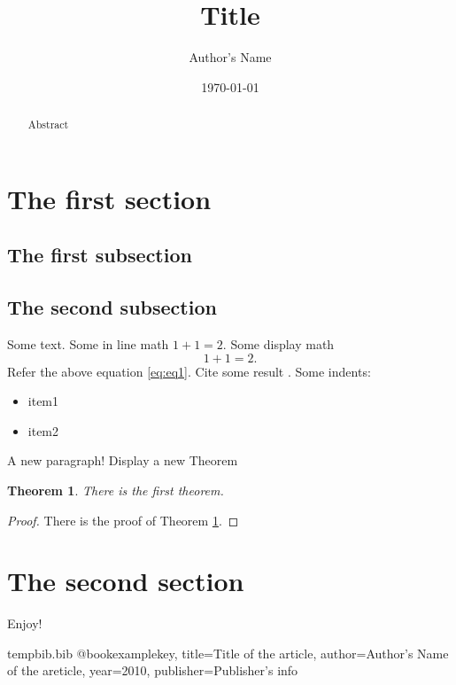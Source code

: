 \documentclass[12pt,a4paper]{amsart}
\title[In line title]{ \large Title}
\author{Author's Name}
\date{\today}
\newtheorem{thm}{Theorem}[section]
\begin{document}
\begin{abstract}
Abstract
\end{abstract}
\maketitle
\section{The first section}\label{the-first-section}
\subsection{The first subsection}\label{the-first-subsection}
\subsection{The second subsection}\label{the-second-subsection}
Some text.
Some in line math \(1+1=2.\)
Some display math \[
1+1=2. \label{eq:eq1}
\] Refer the above equation \eqref{eq:eq1}. Cite some result
\cite{examplekey}. Some indents:
\begin{itemize}
\item
  item1
\item
  item2
\end{itemize}
\par
A new paragraph! Display a new Theorem
\begin{thm}\label{thm:thm1}
There is the first theorem.
\end{thm}
\medskip\begin{proof}
There is the proof of Theorem \ref{thm:thm1}.
\end{proof}
\section{The second section}\label{the-second-section}
Enjoy!
\medskip


\begin{filecontents}{tempbib.bib}
@book{examplekey,
  title={Title of the article},
  author={Author's Name of the areticle},
  year={2010},
  publisher={Publisher's info}
}
\end{filecontents}
\end{document}
